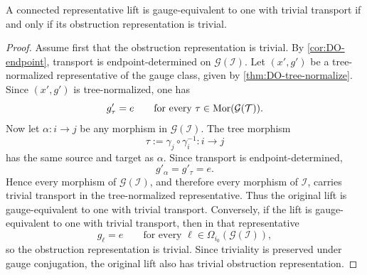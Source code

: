 \begin{corollary}
	A connected representative lift is gauge-equivalent to one with trivial
	transport if and only if its obstruction representation is trivial.
\end{corollary}
\begin{proof}
	Assume first that the obstruction representation is trivial. By
	\cref{cor:DO-endpoint}, transport is endpoint-determined on
	\(\mathcal G(\mathcal I)\). Let \((x',g')\) be a tree-normalized
	representative of the gauge class, given by
	\cref{thm:DO-tree-normalize}. Since \((x',g')\) is tree-normalized, one
	has
	\[
		g'_\tau=e
		\qquad
		\text{for every }\tau\in \mathrm{Mor}(\mathcal G(\mathcal T)).
	\]
	Now let \(\alpha:i\to j\) be any morphism in \(\mathcal G(\mathcal I)\).
	The tree morphism
	\[
		\tau:=\gamma_j\circ \gamma_i^{-1}:i\to j
	\]
	has the same source and target as \(\alpha\). Since transport is
	endpoint-determined,
	\[
		g'_\alpha=g'_\tau=e.
	\]
	Hence every morphism of \(\mathcal G(\mathcal I)\), and therefore every
	morphism of \(\mathcal I\), carries trivial transport in the
	tree-normalized representative. Thus the original lift is
	gauge-equivalent to one with trivial transport.
	Conversely, if the lift is gauge-equivalent to one with trivial
	transport, then in that representative
	\[
		g_\ell=e
		\qquad
		\text{for every }\ell\in \Omega_{i_0}(\mathcal G(\mathcal I)),
	\]
	so the obstruction representation is trivial. Since triviality is
	preserved under gauge conjugation, the original lift also has trivial
	obstruction representation.
\end{proof}

